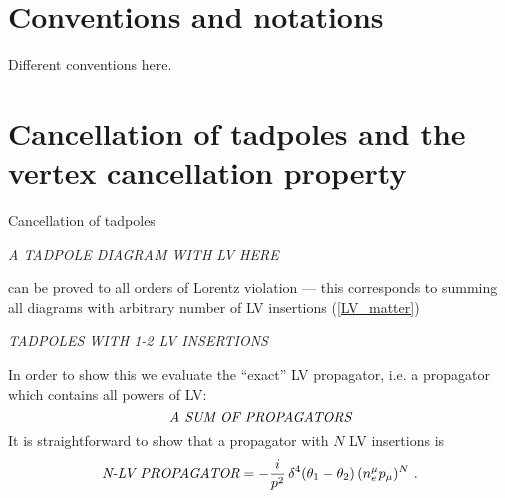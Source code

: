 \documentclass[a4paper,12pt]{article}
\begin{document}
\newpage
\appendix

\section{Conventions and notations}
\label{app_conventions}

	Different conventions here.

\section{Cancellation of tadpoles and 
 	the vertex cancellation property}
\label{app_cancellation}

	Cancellation of tadpoles 

\emph{A TADPOLE DIAGRAM WITH LV HERE}

	can be proved to all orders of Lorentz violation ---
	this corresponds to summing all diagrams with arbitrary
	number of LV insertions (\ref{LV_matter})

\emph{TADPOLES WITH 1-2 LV INSERTIONS}
	
	In order to show this we evaluate the ``exact'' LV 
	propagator, i.e. a propagator which contains all powers
	of LV:
\begin{equation}
\label{def_full_prop}
\emph{A SUM OF PROPAGATORS}
\end{equation}
	It is straightforward to show that a propagator with $ N $
	LV insertions is
\begin{equation}
\label{N_LV_prop}
\emph{N-LV PROPAGATOR} = 
	- \frac{i}{p^2}\, \delta^4(\theta_1 - \theta_2)\,
	    (n_e^\mu p_\mu)^N  
	~.
\end{equation}
\end{document}
